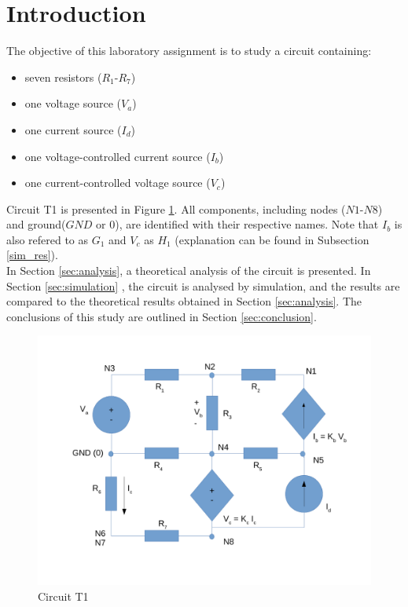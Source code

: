 \section{Introduction}
\label{sec:introduction}


The objective of this laboratory assignment is to study a circuit containing:
\begin{itemize}
	\item seven resistors ($R_1$-$R_7$)
	\item one voltage source ($V_a$)
	\item one current source ($I_d$)
	\item one voltage-controlled current source ($I_b$)
	\item one current-controlled voltage source ($V_c$)
\end{itemize}


Circuit T1 is presented in Figure \ref{fig:Desenho_t1}. All components, including nodes
($N1$-$N8$) and ground($GND$ or $0$), are identified with their respective names. Note
that $I_b$ is also refered to as $G_1$ and $V_c$ as $H_1$ (explanation can be found in 
Subsection \ref{sim_res}). \\

In Section \ref{sec:analysis}, a theoretical analysis of the circuit is
presented. In Section \ref{sec:simulation} , the circuit is analysed by
simulation, and the results are compared to the theoretical results
obtained in Section \ref{sec:analysis}. The conclusions of this study
are outlined in Section \ref{sec:conclusion}.


\begin{figure}[h]
	\centering
	\includegraphics[width=0.85\linewidth]{dsnh_t1.pdf}
	\caption{Circuit T1}
\label{fig:Desenho_t1}
\end{figure}

